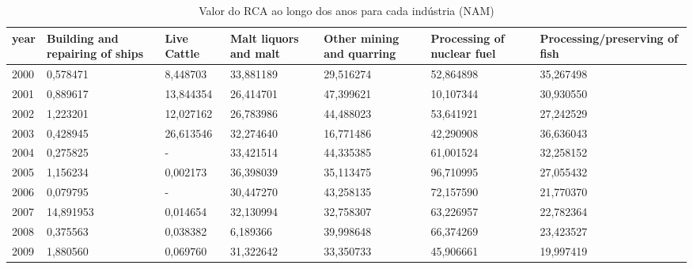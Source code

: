 \begin{table}
\centering
\caption{Valor do RCA ao longo dos anos para cada indústria (NAM)}
\begin{tabular}{p{1cm}p{2cm}p{2cm}p{2cm}p{2cm}p{2cm}p{2cm}}
\toprule
 year &  Building and repairing of ships &  Live Cattle &  Malt liquors and malt &  Other mining and quarring &  Processing of nuclear fuel &  Processing/preserving of fish \\
\midrule
 2000 &                         0,578471 &     8,448703 &              33,881189 &                  29,516274 &                   52,864898 &                      35,267498 \\
 2001 &                         0,889617 &    13,844354 &              26,414701 &                  47,399621 &                   10,107344 &                      30,930550 \\
 2002 &                         1,223201 &    12,027162 &              26,783986 &                  44,488023 &                   53,641921 &                      27,242529 \\
 2003 &                         0,428945 &    26,613546 &              32,274640 &                  16,771486 &                   42,290908 &                      36,636043 \\
 2004 &                         0,275825 &            - &              33,421514 &                  44,335385 &                   61,001524 &                      32,258152 \\
 2005 &                         1,156234 &     0,002173 &              36,398039 &                  35,113475 &                   96,710995 &                      27,055432 \\
 2006 &                         0,079795 &            - &              30,447270 &                  43,258135 &                   72,157590 &                      21,770370 \\
 2007 &                        14,891953 &     0,014654 &              32,130994 &                  32,758307 &                   63,226957 &                      22,782364 \\
 2008 &                         0,375563 &     0,038382 &               6,189366 &                  39,998648 &                   66,374269 &                      23,423527 \\
 2009 &                         1,880560 &     0,069760 &              31,322642 &                  33,350733 &                   45,906661 &                      19,997419 \\

\end{tabular}
\end{table}
